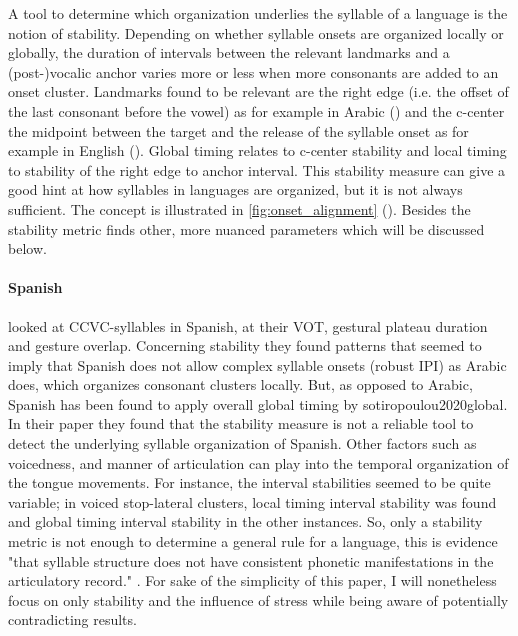 \documentclass[../Proposal.tex]{subfiles}
\begin{document}
A tool to determine which organization underlies the syllable of a language is the notion of stability. Depending on whether syllable onsets are organized locally or globally, the duration of intervals between the relevant landmarks and a (post-)vocalic anchor varies more or less when more consonants are added to an onset cluster. Landmarks found to be relevant are the right edge (i.e. the offset of the last consonant before the vowel) as for example in Arabic (\cite{shaw2015stochastic}) and the c-center the midpoint between the target and the release of the syllable onset as for example in English (\cite{shaw2015stochastic}). Global timing relates to c-center stability and local timing to stability of the right edge to anchor interval. This stability measure can give a good hint at how syllables in languages are organized, but it is not always sufficient. The concept is illustrated in \cref{fig:onset_alignment} (\cite{shaw2015stochastic}). Besides the stability metric  \cite[]{sotiropoulou2020global} finds other, more nuanced parameters which will be discussed below.

\paragraph{Spanish} \cite{gibson2019temporal} looked at CCVC-syllables in Spanish, at their VOT, gestural plateau duration and gesture overlap. Concerning stability they found patterns that seemed to imply that Spanish does not allow complex syllable onsets (robust IPI) as Arabic does, which organizes consonant clusters locally. 
But, as opposed to Arabic, Spanish has been found to apply overall global timing by \citeauthor{}{sotiropoulou2020global}. In their paper \cite{sotiropoulou2020global} they found that the stability measure is not a reliable tool to detect the underlying syllable organization of Spanish.  Other factors such as voicedness, and manner of articulation can play into the temporal organization of the tongue movements. For instance, the interval stabilities seemed to be quite variable; in voiced stop-lateral clusters, local timing interval stability was found and global timing interval stability in the other instances. So, only a stability metric is not enough to determine a general rule for a language, this is evidence "that syllable structure does not have consistent phonetic manifestations in the articulatory record." \cite[22]{sotiropoulou2020global}.
For sake of the simplicity of this paper, I will nonetheless focus on only stability and the influence of stress while being aware of potentially contradicting results.
\end{document}
